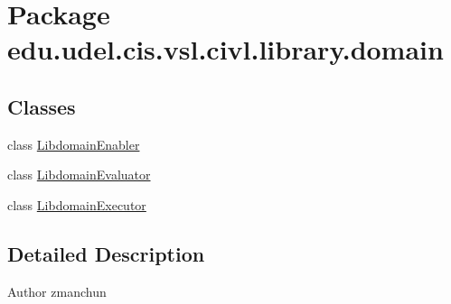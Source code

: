 \hypertarget{namespaceedu_1_1udel_1_1cis_1_1vsl_1_1civl_1_1library_1_1domain}{}\section{Package edu.\+udel.\+cis.\+vsl.\+civl.\+library.\+domain}
\label{namespaceedu_1_1udel_1_1cis_1_1vsl_1_1civl_1_1library_1_1domain}
\subsection*{Classes}
\begin{DoxyCompactItemize}
\item 
class \hyperlink{classedu_1_1udel_1_1cis_1_1vsl_1_1civl_1_1library_1_1domain_1_1LibdomainEnabler}{Libdomain\+Enabler}
\item 
class \hyperlink{classedu_1_1udel_1_1cis_1_1vsl_1_1civl_1_1library_1_1domain_1_1LibdomainEvaluator}{Libdomain\+Evaluator}
\item 
class \hyperlink{classedu_1_1udel_1_1cis_1_1vsl_1_1civl_1_1library_1_1domain_1_1LibdomainExecutor}{Libdomain\+Executor}
\end{DoxyCompactItemize}


\subsection{Detailed Description}
\begin{DoxyAuthor}{Author}
zmanchun 
\end{DoxyAuthor}
